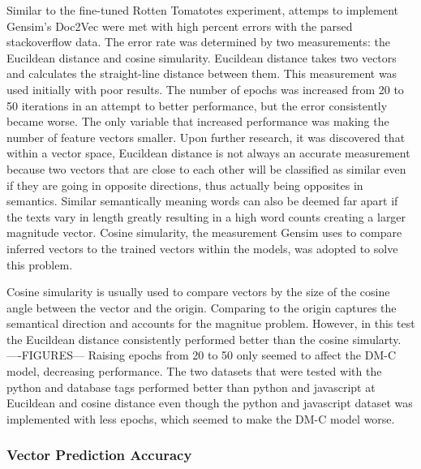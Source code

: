 Similar to the fine-tuned Rotten Tomatotes experiment, attemps to implement Gensim's Doc2Vec were met with high percent errors with the parsed stackoverflow data. The error rate was determined by two measurements: the Eucildean distance and cosine simularity. Eucildean distance takes two vectors and calculates the straight-line distance between them. This measurement was used initially with poor results. The number of epochs was increased from 20 to 50 iterations in an attempt to better performance, but the error consistently became worse. The only variable that increased performance was making the number of feature vectors smaller. Upon further research, it was discovered that within a vector space, Eucildean distance is not always an accurate measurement because two vectors that are close to each other will be classified as similar even if they are going in opposite directions, thus actually being opposites in semantics. Similar semantically meaning words can also be deemed far apart if the texts vary in length greatly resulting in a high word counts creating a larger magnitude vector. Cosine simularity, the measurement Gensim uses to compare inferred vectors to the trained vectors within the models, was adopted to solve this problem.

Cosine simularity is usually used to compare vectors by the size of the cosine angle between the vector and the origin. Comparing to the origin captures the semantical direction and accounts for the magnitue problem. However, in this test the Eucildean distance consistently performed better than the cosine simularty.  ----FIGURES---  Raising epochs from 20 to 50 only seemed to affect the DM-C model, decreasing performance. The two datasets that were tested with the python and database tags performed better than python and javascript at Eucildean and cosine distance even though the python and javascript dataset was implemented with less epochs, which seemed to make the DM-C model worse. 

\subsubsection{Vector Prediction Accuracy}


